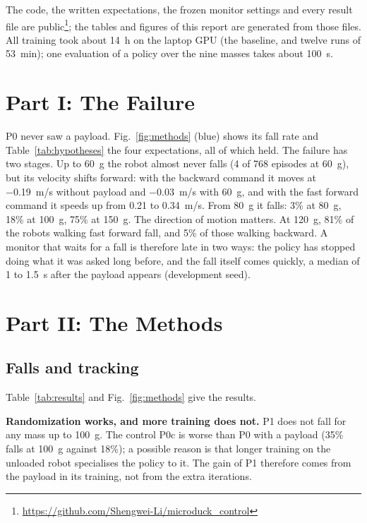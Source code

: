 \documentclass[conference]{IEEEtran}
\begin{document}
The code, the written expectations, the frozen monitor settings and every result file are public\footnote{\url{https://github.com/Shengwei-Li/microduck_control}}; the tables and figures of this report are generated from those files.
All training took about \SI{14}{h} on the laptop GPU (the baseline, and twelve runs of \SI{53}{min}); one evaluation of a policy over the nine masses takes about \SI{100}{s}.

\section{Part I: The Failure}
\label{sec:part1}

P0 never saw a payload. Fig.~\ref{fig:methods} (blue) shows its fall rate and Table~\ref{tab:hypotheses} the four expectations, all of which held.
The failure has two stages.
Up to \SI{60}{g} the robot almost never falls (4 of 768 episodes at \SI{60}{g}), but its velocity shifts forward: with the backward command it moves at \SI{-0.19}{m/s} without payload and \SI{-0.03}{m/s} with \SI{60}{g}, and with the fast forward command it speeds up from 0.21 to \SI{0.34}{m/s}.
From \SI{80}{g} it falls: 3\% at \SI{80}{g}, 18\% at \SI{100}{g}, 75\% at \SI{150}{g}.
The direction of motion matters. At \SI{120}{g}, 81\% of the robots walking fast forward fall, and 5\% of those walking backward.
A monitor that waits for a fall is therefore late in two ways: the policy has stopped doing what it was asked long before, and the fall itself comes quickly, a median of 1 to \SI{1.5}{s} after the payload appears (development seed).

\section{Part II: The Methods}
\label{sec:part2}

\subsection{Falls and tracking}

Table~\ref{tab:results} and Fig.~\ref{fig:methods} give the results.

\textbf{Randomization works, and more training does not.} P1 does not fall for any mass up to \SI{100}{g}. The control P0c is worse than P0 with a payload (35\% falls at \SI{100}{g} against 18\%); a possible reason is that longer training on the unloaded robot specialises the policy to it. The gain of P1 therefore comes from the payload in its training, not from the extra iterations.
\end{document}
